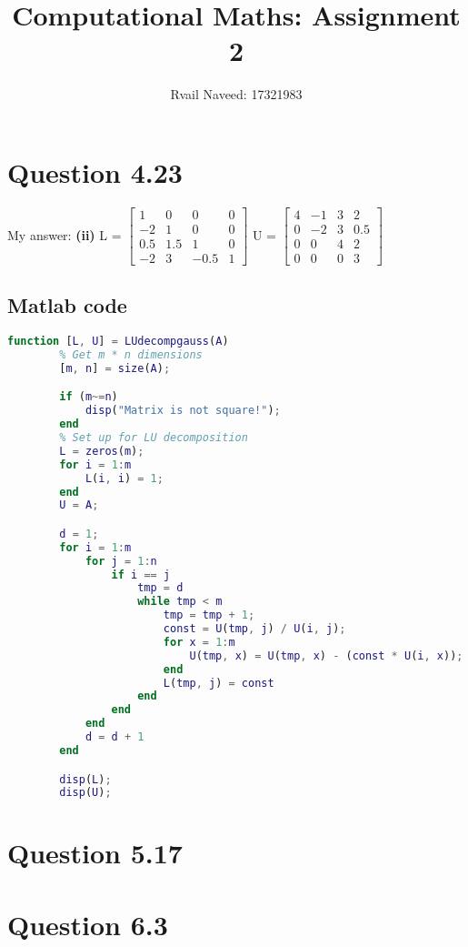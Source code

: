 \documentclass{article}
\title{Computational Maths: Assignment 2}
\author{Rvail Naveed: 17321983}
\begin{document}
    \maketitle
    \newpage

    \section{Question 4.23}
        My answer: \textbf{(ii)}
        L = 
        $\begin{bmatrix}
            1 & 0 & 0 & 0 \\
            -2 & 1 & 0 & 0 \\
            0.5 & 1.5 & 1 & 0 \\ 
            -2 & 3 & -0.5 & 1
        \end{bmatrix}$
        U = 
        $\begin{bmatrix}
            4 & -1 & 3 & 2 \\ 
            0 & -2 & 3 & 0.5 \\ 
            0 & 0 & 4 & 2 \\ 
            0 & 0 & 0 & 3
        \end{bmatrix}$
        
        \subsection{Matlab code}
        \begin{lstlisting}[language=Matlab]
        function [L, U] = LUdecompgauss(A)
        % Get m * n dimensions
        [m, n] = size(A);

        if (m~=n)
            disp("Matrix is not square!");
        end
        % Set up for LU decomposition
        L = zeros(m);
        for i = 1:m
            L(i, i) = 1;
        end
        U = A;

        d = 1;
        for i = 1:m
            for j = 1:n
                if i == j
                    tmp = d
                    while tmp < m
                        tmp = tmp + 1;
                        const = U(tmp, j) / U(i, j);
                        for x = 1:m
                            U(tmp, x) = U(tmp, x) - (const * U(i, x));
                        end
                        L(tmp, j) = const
                    end
                end
            end
            d = d + 1
        end

        disp(L);
        disp(U);
        \end{lstlisting}
    
    \section{Question 5.17}

    \section{Question 6.3}
\end{document}
